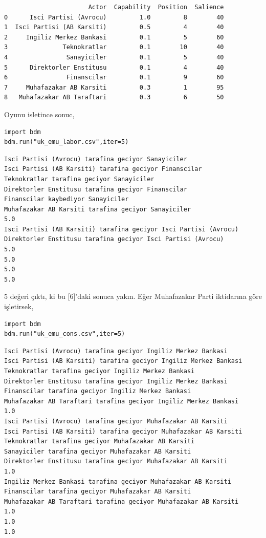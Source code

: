 \documentclass[12pt,fleqn]{article}\usepackage{../../common}
\begin{document}
\begin{verbatim}
                       Actor  Capability  Position  Salience
0      Isci Partisi (Avrocu)         1.0         8        40
1  Isci Partisi (AB Karsiti)         0.5         4        40
2     Ingiliz Merkez Bankasi         0.1         5        60
3               Teknokratlar         0.1        10        40
4                Sanayiciler         0.1         5        40
5      Direktorler Enstitusu         0.1         4        40
6                Finanscilar         0.1         9        60
7     Muhafazakar AB Karsiti         0.3         1        95
8   Muhafazakar AB Taraftari         0.3         6        50
\end{verbatim}

Oyunu isletince sonuc,

\begin{verbatim}
import bdm
bdm.run("uk_emu_labor.csv",iter=5)
\end{verbatim}

\begin{verbatim}
Isci Partisi (Avrocu) tarafina geciyor Sanayiciler
Isci Partisi (AB Karsiti) tarafina geciyor Finanscilar
Teknokratlar tarafina geciyor Sanayiciler
Direktorler Enstitusu tarafina geciyor Finanscilar
Finanscilar kaybediyor Sanayiciler
Muhafazakar AB Karsiti tarafina geciyor Sanayiciler
5.0
Isci Partisi (AB Karsiti) tarafina geciyor Isci Partisi (Avrocu)
Direktorler Enstitusu tarafina geciyor Isci Partisi (Avrocu)
5.0
5.0
5.0
5.0
\end{verbatim}

5 değeri çıktı, ki bu [6]'daki sonuca yakın. Eğer Muhafazakar Parti iktidarına
göre işletirsek,

\begin{verbatim}
import bdm
bdm.run("uk_emu_cons.csv",iter=5)
\end{verbatim}

\begin{verbatim}
Isci Partisi (Avrocu) tarafina geciyor Ingiliz Merkez Bankasi
Isci Partisi (AB Karsiti) tarafina geciyor Ingiliz Merkez Bankasi
Teknokratlar tarafina geciyor Ingiliz Merkez Bankasi
Direktorler Enstitusu tarafina geciyor Ingiliz Merkez Bankasi
Finanscilar tarafina geciyor Ingiliz Merkez Bankasi
Muhafazakar AB Taraftari tarafina geciyor Ingiliz Merkez Bankasi
1.0
Isci Partisi (Avrocu) tarafina geciyor Muhafazakar AB Karsiti
Isci Partisi (AB Karsiti) tarafina geciyor Muhafazakar AB Karsiti
Teknokratlar tarafina geciyor Muhafazakar AB Karsiti
Sanayiciler tarafina geciyor Muhafazakar AB Karsiti
Direktorler Enstitusu tarafina geciyor Muhafazakar AB Karsiti
1.0
Ingiliz Merkez Bankasi tarafina geciyor Muhafazakar AB Karsiti
Finanscilar tarafina geciyor Muhafazakar AB Karsiti
Muhafazakar AB Taraftari tarafina geciyor Muhafazakar AB Karsiti
1.0
1.0
1.0
\end{verbatim}
\end{document}
